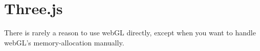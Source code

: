 \section{Three.js}
There is rarely a reason to use webGL directly, except when you want to handle webGL's memory-allocation manually.
